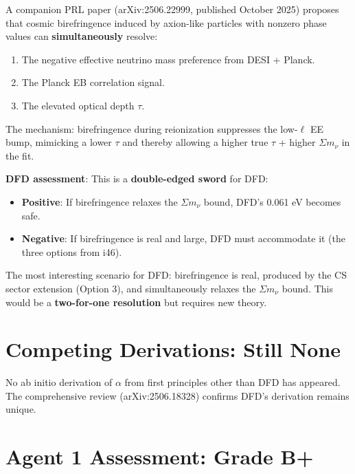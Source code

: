 \documentclass[11pt,a4paper]{article}
\begin{document}
\begin{tcolorbox}[colback=blue!5!white, colframe=blue!60!black,
  title={PRL (2025): Birefringence Resolves Negative $\Sigma m_\nu$ Tension --- Namikawa et al.}]

A companion PRL paper (arXiv:2506.22999, published October 2025) proposes that cosmic birefringence induced by axion-like particles with nonzero phase values can \textbf{simultaneously} resolve:
\begin{enumerate}
\item The negative effective neutrino mass preference from DESI + Planck.
\item The Planck EB correlation signal.
\item The elevated optical depth $\tau$.
\end{enumerate}

The mechanism: birefringence during reionization suppresses the low-$\ell$ EE bump, mimicking a lower $\tau$ and thereby allowing a higher true $\tau$ + higher $\Sigma m_\nu$ in the fit.

\textbf{DFD assessment}: This is a \textbf{double-edged sword} for DFD:
\begin{itemize}
\item \textbf{Positive}: If birefringence relaxes the $\Sigma m_\nu$ bound, DFD's 0.061 eV becomes safe.
\item \textbf{Negative}: If birefringence is real and large, DFD must accommodate it (the three options from i46).
\end{itemize}

The most interesting scenario for DFD: birefringence is real, produced by the CS sector extension (Option 3), and simultaneously relaxes the $\Sigma m_\nu$ bound. This would be a \textbf{two-for-one resolution} but requires new theory.
\end{tcolorbox}

\section{Competing Derivations: Still None}

No ab initio derivation of $\alpha$ from first principles other than DFD has appeared. The comprehensive review (arXiv:2506.18328) confirms DFD's derivation remains unique.

\section{Agent 1 Assessment: Grade B+}
\end{document}
